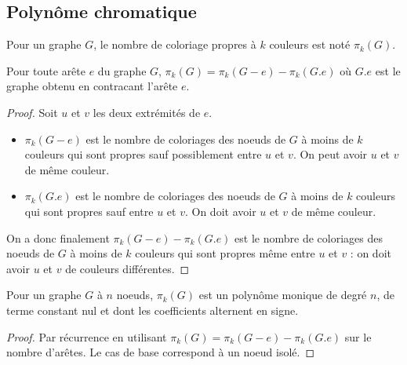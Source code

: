 \subsection{Polynôme chromatique}
Pour un graphe $G$, le nombre de coloriage propres à $k$ couleurs est noté $\pi_k(G)$.
\begin{mytheo}
  Pour toute arête $e$ du graphe $G$, $\pi_k(G) = \pi_k(G-e) - \pi_k(G.e)$ où $G.e$ est le graphe obtenu en contracant l'arête $e$.
  \begin{proof}
  Soit $u$ et $v$ les deux extrémités de $e$.
	\begin{itemize}
	\item $\pi_k(G-e)$ est le nombre de coloriages des noeuds de $G$ à moins de $k$ couleurs qui sont propres sauf possiblement entre $u$ et $v$. On peut avoir $u$ et $v$ de même couleur.
	\item $\pi_k(G.e)$ est le nombre de coloriages des noeuds de $G$ à moins de $k$ couleurs qui sont propres sauf entre $u$ et $v$. On doit avoir $u$ et $v$ de même couleur.
	\end{itemize}
	On a donc finalement $\pi_k(G-e) - \pi_k(G.e)$ est le nombre de coloriages des noeuds de $G$ à moins de $k$ couleurs qui sont propres même entre $u$ et $v$ : on doit avoir $u$ et $v$ de couleurs différentes.
  \end{proof}
\end{mytheo}

\begin{mycorr} [Birkhoff]
  Pour un graphe $G$ à $n$ noeuds, $\pi_k (G)$ est un polynôme monique de degré $n$, de terme constant nul et dont les coefficients alternent en signe.
  \begin{proof}
    Par récurrence en utilisant $\pi_k(G) = \pi_k(G-e)-\pi_k(G.e)$ sur le nombre d'arêtes. Le cas de base correspond à un noeud isolé.
  \end{proof}
\end{mycorr}
